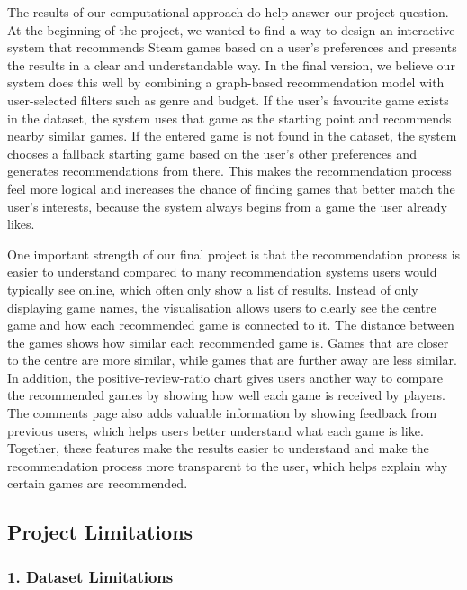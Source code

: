 \documentclass[fontsize=11pt]{article}
\begin{document}
The results of our computational approach do help answer our project question. At the beginning of the project, we wanted to find a way to design an interactive system that recommends Steam games based on a user’s preferences and presents the results in a clear and understandable way. In the final version, we believe our system does this well by combining a graph-based recommendation model with user-selected filters such as genre and budget. If the user’s favourite game exists in the dataset, the system uses that game as the starting point and recommends nearby similar games. If the entered game is not found in the dataset, the system chooses a fallback starting game based on the user’s other preferences and generates recommendations from there. This makes the recommendation process feel more logical and increases the chance of finding games that better match the user’s interests, because the system always begins from a game the user already likes.

One important strength of our final project is that the recommendation process is easier to understand compared to many recommendation systems users would typically see online, which often only show a list of results. Instead of only displaying game names, the visualisation allows users to clearly see the centre game and how each recommended game is connected to it. The distance between the games shows how similar each recommended game is. Games that are closer to the centre are more similar, while games that are further away are less similar. In addition, the positive-review-ratio chart gives users another way to compare the recommended games by showing how well each game is received by players. The comments page also adds valuable information by showing feedback from previous users, which helps users better understand what each game is like. Together, these features make the results easier to understand and make the recommendation process more transparent to the user, which helps explain why certain games are recommended.

\subsection*{Project Limitations}

\subsubsection*{1. Dataset Limitations}
\end{document}
